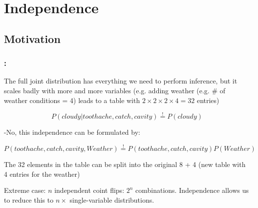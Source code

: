 \section{Independence}



\subsection{Motivation}

\begin{frame}\frametitle{\secname:~\subsecname}

The full joint distribution has everything we need to perform inference,
but it scales badly with more and more variables (e.g. adding weather (e.g. \# of weather conditions = 4) leads to a table with $2\times2\times2\times4=32$ entries)


\begin{equation}
P(cloudy | toothache, catch, cavity) \stackrel{!}{=} P(cloudy)
\end{equation}


-No, this independence can be formulated by:

\begin{equation}
P(toothache, catch, cavity, Weather) \stackrel{!}{=} P(toothache, catch, cavity)P(Weather)
\end{equation}

The 32 elements in the table can be split into the original 8 + 4 (new table with 4 entries for the weather)


Extreme case: $n$ independent coint flips: $2^n$ combinations. Independence allows us to reduce this to $n \times$ single-variable distributions. 

\end{frame}

